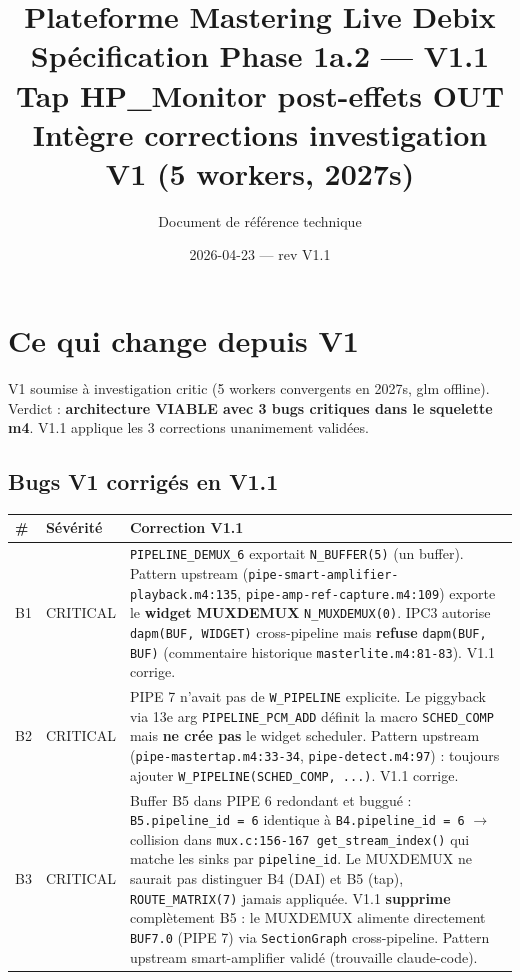 \documentclass[11pt,a4paper]{article}
\title{\textbf{Plateforme Mastering Live Debix}\\[6pt]
  \Large Spécification Phase 1a.2 --- \textbf{V1.1}\\[4pt]
  \large Tap HP\_Monitor post-effets OUT\\
  \normalsize Intègre corrections investigation V1 (5 workers, 2027s)}
\author{Document de référence technique}
\date{2026-04-23 --- rev V1.1}
\begin{document}
\maketitle
\tableofcontents
\clearpage

\section{Ce qui change depuis V1}

V1 soumise à investigation critic (5 workers convergents en 2027s, glm offline). Verdict : \textbf{architecture VIABLE avec 3 bugs critiques dans le squelette m4}. V1.1 applique les 3 corrections unanimement validées.

\subsection{Bugs V1 corrigés en V1.1}

\begin{center}
\begin{tabularx}{\textwidth}{llX}
\toprule
\textbf{\#} & \textbf{Sévérité} & \textbf{Correction V1.1} \\
\midrule
B1 & CRITICAL & \texttt{PIPELINE\_DEMUX\_6} exportait \texttt{N\_BUFFER(5)} (un buffer). Pattern upstream (\texttt{pipe-smart-amplifier-playback.m4:135}, \texttt{pipe-amp-ref-capture.m4:109}) exporte le \textbf{widget MUXDEMUX} \texttt{N\_MUXDEMUX(0)}. IPC3 autorise \texttt{dapm(BUF, WIDGET)} cross-pipeline mais \textbf{refuse} \texttt{dapm(BUF, BUF)} (commentaire historique \texttt{masterlite.m4:81-83}). V1.1 corrige. \\
B2 & CRITICAL & PIPE 7 n'avait pas de \texttt{W\_PIPELINE} explicite. Le piggyback via 13e arg \texttt{PIPELINE\_PCM\_ADD} définit la macro \texttt{SCHED\_COMP} mais \textbf{ne crée pas} le widget scheduler. Pattern upstream (\texttt{pipe-mastertap.m4:33-34}, \texttt{pipe-detect.m4:97}) : toujours ajouter \texttt{W\_PIPELINE(SCHED\_COMP, ...)}. V1.1 corrige. \\
B3 & CRITICAL & Buffer B5 dans PIPE 6 redondant et buggué : \texttt{B5.pipeline\_id = 6} identique à \texttt{B4.pipeline\_id = 6} $\to$ collision dans \texttt{mux.c:156-167 get\_stream\_index()} qui matche les sinks par \texttt{pipeline\_id}. Le MUXDEMUX ne saurait pas distinguer B4 (DAI) et B5 (tap), \texttt{ROUTE\_MATRIX(7)} jamais appliquée. V1.1 \textbf{supprime} complètement B5 : le MUXDEMUX alimente directement \texttt{BUF7.0} (PIPE 7) via \texttt{SectionGraph} cross-pipeline. Pattern upstream smart-amplifier validé (trouvaille claude-code). \\
\bottomrule
\end{tabularx}
\end{center}
\end{document}
